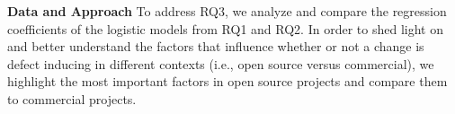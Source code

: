 


\noindent \textbf{Data and Approach}
To address RQ3, we analyze and compare the regression coefficients of the logistic models from RQ1 and RQ2. In order to shed light on and better understand the factors that influence whether or not a change is defect inducing in different contexts (i.e., open source versus commercial), we highlight the most important factors in open source projects and compare them to commercial projects.


